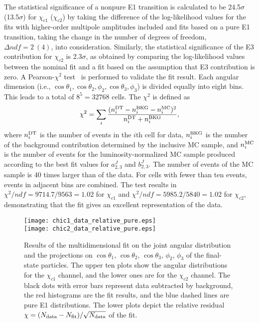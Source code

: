 \documentclass[prd,twocolumn,showpacs,amsmath,amssymb]{revtex4-1}
\begin{document}
The statistical significance of a nonpure E1 transition is calculated to be
24.5$\sigma$ (13.5$\sigma$) for $\chi_{c1}$ ($\chi_{c2}$) by taking the difference of the log-likelihood values for the fits with
higher-order multipole amplitudes included and fits based on a pure E1 transition, taking the change in the number of degrees of freedom, $\Delta ndf = 2~(4)$,
into consideration. Similarly, the statistical significance of the E3 contribution for $\chi_{c2}$ is 2.3$\sigma$, as obtained by comparing the log-likelihood values between the nominal fit and a fit based on the assumption that E3 contribution is zero.
A Pearson-$\chi^{2}$ test~\cite{Pearson_test} is performed to validate the fit result. Each angular dimension
(i.e., $\cos\theta_{1}, \cos\theta_{2}, \phi_{2}, \cos\theta_{3}, \phi_{3}$) is divided equally into eight bins.
This leads to a total of $8^5 = 32768$ cells. The $\chi^{2}$ is defined as
%
\begin{equation}\label{chi2_define}
  \chi^{2} = \mathop{\sum_{i}}\frac{(n_{i}^{\rm DT}-n_i^{\rm BKG}-n_{i}^{\rm MC})^{2}}{n_{i}^{\rm DT}+n_i^{\rm BKG}},
\end{equation}
\noindent where $n_{i}^{\rm DT}$ is the number of events in the $i$th cell for data, $n_i^{\rm BKG}$ is the number of the background contribution determined by the inclusive MC sample, and
$n_{i}^{\rm MC}$ is the number of events for the luminosity-normalized MC sample produced according to the best fit values for $a_{2,3}^J$ and $b_{2,3}^J$.
The number of events of the MC sample is 40 times larger than of the data. For cells with fewer than ten events,
events in adjacent bins are combined.
The test results in $\chi^{2}/ndf = 9714.7/9563 = 1.02$ for $\chi_{c1}$ and $\chi^{2}/ndf = 5985.2/5840 = 1.02$ for $\chi_{c2}$, demonstrating that the fit gives an excellent representation of the data.

\begin{figure*}
  \centering
  \texttt{[image: chic1\_data\_relative\_pure.eps]}\\
  \texttt{[image: chic2\_data\_relative\_pure.eps]}\\
  \caption{Results of the multidimensional fit on the joint angular distribution and the projections on
$\cos\theta_{1}$, $\cos\theta_{2}$,  $\cos\theta_{3}$, $\phi_{2}$, $\phi_{3}$ of the final-state particles.
The upper ten plots show the angular distributions for the $\chi_{c1}$ channel, and the lower ones are for the $\chi_{c2}$ channel.
The black dots with error bars represent data subtracted by background, the red histograms are the fit results, and the blue dashed lines are pure E1 distributions. The lower plots depict the relative residual $\chi = (N_{\rm data}-N_{\rm fit})/\sqrt{N_{\rm data}}$ of the fit.}\label{chic1_data}
\end{figure*}
\end{document}
